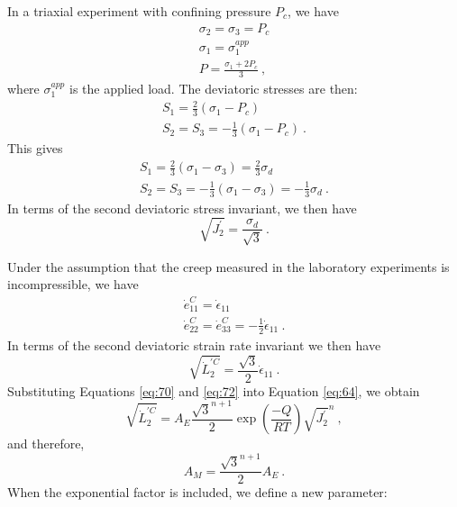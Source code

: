 In a triaxial experiment with confining pressure $P_{c}$, we have
\begin{gather}
\sigma_{2}=\sigma_{3}=P_{c}\nonumber \\
\sigma_{1}=\sigma_{1}^{app}\label{eq:67}\\
P=\frac{\sigma_{1}+2P_{c}}{3}\:,\nonumber 
\end{gather}
where $\sigma_{1}^{app}$ is the applied load. The deviatoric stresses
are then:
\begin{gather}
S_{1}=\frac{2}{3}\left(\sigma_{1}-P_{c}\right)\nonumber \\
S_{2}=S_{3}=-\frac{1}{3}\left(\sigma_{1}-P_{c}\right)\:.\label{eq:68}
\end{gather}
This gives
\begin{gather}
S_{1}=\frac{2}{3}\left(\sigma_{1}-\sigma_{3}\right)=\frac{2}{3}\sigma_{d}\nonumber \\
S_{2}=S_{3}=-\frac{1}{3}\left(\sigma_{1}-\sigma_{3}\right)=-\frac{1}{3}\sigma_{d}\:.\label{eq:69}
\end{gather}
In terms of the second deviatoric stress invariant, we then have
\begin{equation}
\sqrt{J_{2}^{\prime}}=\frac{\sigma_{d}}{\sqrt{3}}\:.\label{eq:70}
\end{equation}


Under the assumption that the creep measured in the laboratory experiments
is incompressible, we have
\begin{gather}
\dot{e}_{11}^{C}=\dot{\epsilon}_{11}\nonumber \\
\dot{e}_{22}^{C}=\dot{e}_{33}^{C}=-\frac{1}{2}\dot{\epsilon}_{11}\:.\label{eq:71}
\end{gather}
In terms of the second deviatoric strain rate invariant we then have
\begin{equation}
\sqrt{\dot{L}_{2}^{\prime C}}=\frac{\sqrt{3}}{2}\dot{\epsilon}_{11}\:.\label{eq:72}
\end{equation}
Substituting Equations \ref{eq:70} and \ref{eq:72} into Equation
\ref{eq:64}, we obtain
\begin{equation}
\sqrt{\dot{L}_{2}^{\prime C}}=A_{E}\frac{\sqrt{3}^{n+1}}{2}\exp\left(\frac{-Q}{RT}\right)\sqrt{J_{2}^{\prime}}^{n}\:,\label{eq:73}
\end{equation}
and therefore,
\begin{equation}
A_{M}=\frac{\sqrt{3}^{n+1}}{2}A_{E}\:.\label{eq:74}
\end{equation}
When the exponential factor is included, we define a new parameter:

